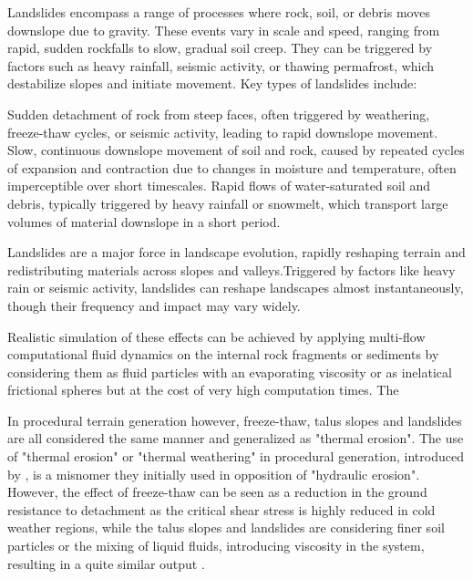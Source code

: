 Landslides encompass a range of processes where rock, soil, or debris moves downslope due to gravity. These events vary in scale and speed, ranging from rapid, sudden rockfalls to slow, gradual soil creep. They can be triggered by factors such as heavy rainfall, seismic activity, or thawing permafrost, which destabilize slopes and initiate movement. Key types of landslides include:
\begin{Itemize}
    
     Sudden detachment of rock from steep faces, often triggered by weathering, freeze-thaw cycles, or seismic activity, leading to rapid downslope movement. 
     Slow, continuous downslope movement of soil and rock, caused by repeated cycles of expansion and contraction due to changes in moisture and temperature, often imperceptible over short timescales.
     Rapid flows of water-saturated soil and debris, typically triggered by heavy rainfall or snowmelt, which transport large volumes of material downslope in a short period.
\end{Itemize}
    
Landslides are a major force in landscape evolution, rapidly reshaping terrain and redistributing materials across slopes and valleys.Triggered by factors like heavy rain or seismic activity, landslides can reshape landscapes almost instantaneously, though their frequency and impact may vary widely.

\smallConclusion

Realistic simulation of these effects can be achieved by applying multi-flow computational fluid dynamics on the internal rock fragments or sediments by considering them as fluid particles with an evaporating viscosity \cite{Feng2024,Harmon2001,Lenaerts2009} or as inelatical frictional spheres \cite{Walton1993} but at the cost of very high computation times. The 

In procedural terrain generation however, freeze-thaw, talus slopes and landslides are all considered the same manner and generalized as "thermal erosion". The use of "thermal erosion" or "thermal weathering" in procedural generation, introduced by \cite{Musgrave1989}, is a misnomer they initially used in opposition of "hydraulic erosion". However, the effect of freeze-thaw can be seen as a reduction in the ground resistance to detachment as the critical shear stress is highly reduced in cold weather regions, while the talus slopes and landslides are considering finer soil particles or the mixing of liquid fluids, introducing viscosity in the system, resulting in a quite similar output \cite{Hudak2011}.


